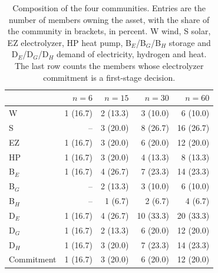 \begin{table}[!t]
\caption{Composition of the four communities. Entries are the number of members owning the asset, with the share of the community in brackets, in percent. W wind, S solar, EZ electrolyzer, HP heat pump, B$_{E}$/B$_{G}$/B$_{H}$ storage and D$_{E}$/D$_{G}$/D$_{H}$ demand of electricity, hydrogen and heat. The last row counts the members whose electrolyzer commitment is a first-stage decision.}
\label{tab:composition}
\centering
\footnotesize
\setlength{\tabcolsep}{3pt}
\begin{tabular}{@{}l r r r r@{}}
\toprule
 & $n=6$ & $n=15$ & $n=30$ & $n=60$ \\
\midrule
W & 1 (16.7) & 2 (13.3) & 3 (10.0) & 6 (10.0) \\
S & -- & 3 (20.0) & 8 (26.7) & 16 (26.7) \\
EZ & 1 (16.7) & 3 (20.0) & 6 (20.0) & 12 (20.0) \\
HP & 1 (16.7) & 3 (20.0) & 4 (13.3) & 8 (13.3) \\
B$_{E}$ & 1 (16.7) & 4 (26.7) & 7 (23.3) & 14 (23.3) \\
B$_{G}$ & -- & 2 (13.3) & 3 (10.0) & 6 (10.0) \\
B$_{H}$ & -- & 1 (6.7) & 2 (6.7) & 4 (6.7) \\
D$_{E}$ & 1 (16.7) & 4 (26.7) & 10 (33.3) & 20 (33.3) \\
D$_{G}$ & 1 (16.7) & 2 (13.3) & 6 (20.0) & 12 (20.0) \\
D$_{H}$ & 1 (16.7) & 3 (20.0) & 7 (23.3) & 14 (23.3) \\
\midrule
Commitment & 1 (16.7) & 3 (20.0) & 6 (20.0) & 12 (20.0) \\
\bottomrule
\end{tabular}
\end{table}

